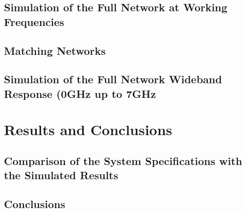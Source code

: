 \documentclass[12pt]{report} %
\let\oldsection\section
\renewcommand\section{\clearpage\oldsection}
\begin{document}
\section{Simulation of the Full Network at Working Frequencies}

\section{Matching Networks} %

\section{Simulation of the Full Network Wideband Response (0GHz up to 7GHz}







\chapter{Results and Conclusions}

\section{Comparison of the System Specifications with the Simulated Results}

\section{Conclusions} %


























\clearpage
{}
\printbibliography



\end{document}
